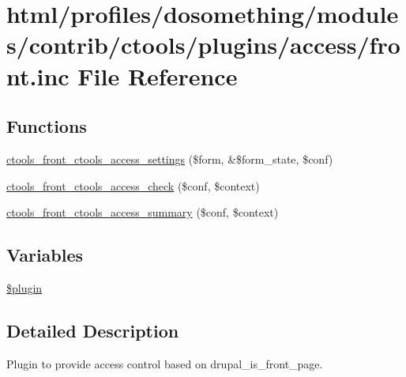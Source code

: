 \hypertarget{front_8inc}{
\section{html/profiles/dosomething/modules/contrib/ctools/plugins/access/front.inc File Reference}
\label{front_8inc}
}
\subsection*{Functions}
\begin{DoxyCompactItemize}
\item 
\hyperlink{front_8inc_a19eabac2ae4f01d216eb0a2e44885e0f}{ctools\_\-front\_\-ctools\_\-access\_\-settings} (\$form, \&\$form\_\-state, \$conf)
\item 
\hyperlink{front_8inc_ab2a1e57e6f2d8bf27845aeea6428af76}{ctools\_\-front\_\-ctools\_\-access\_\-check} (\$conf, \$context)
\item 
\hyperlink{front_8inc_aaafad56207919a3c1e59bf615ab7540c}{ctools\_\-front\_\-ctools\_\-access\_\-summary} (\$conf, \$context)
\end{DoxyCompactItemize}
\subsection*{Variables}
\begin{DoxyCompactItemize}
\item 
\hyperlink{front_8inc_ada8a7130088351710bb02ed622d6bf65}{\$plugin}
\end{DoxyCompactItemize}


\subsection{Detailed Description}
Plugin to provide access control based on drupal\_\-is\_\-front\_\-page. 

